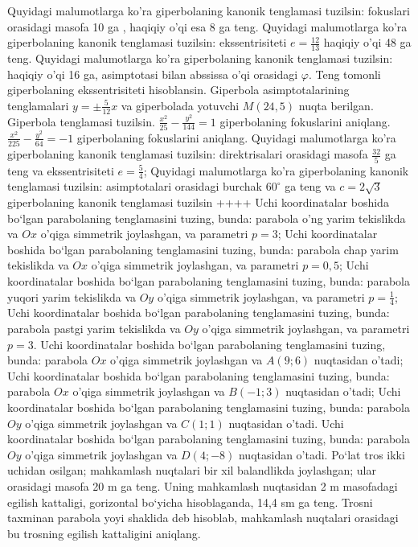 Quyidagi malumotlarga ko'ra giperbolaning kanonik tenglamasi tuzilsin: fokuslari orasidagi masofa 10 ga , haqiqiy o'qi esa 8 ga teng.
Quyidagi malumotlarga ko'ra giperbolaning kanonik tenglamasi tuzilsin: ekssentrisiteti $e=\frac{12}{13}$ haqiqiy o'qi 48 ga teng.
Quyidagi malumotlarga ko'ra giperbolaning kanonik tenglamasi tuzilsin: haqiqiy o'qi 16 ga, asimptotasi bilan abssissa o'qi orasidagi $\varphi$.
Teng tomonli giperbolaning ekssentrisiteti hisoblansin.
Giperbola asimptotalarining tenglamalari $y= \pm \frac{5}{12} x$ va giperbolada yotuvchi $M(24,5)$ nuqta berilgan. Giperbola tenglamasi tuzilsin.
$\frac{x^2}{25}-\frac{y^2}{144}=1$ giperbolaning fokuslarini aniqlang.
$\frac{x^2}{225}-\frac{y^2}{64}=-1$ giperbolaning fokuslarini aniqlang.
Quyidagi malumotlarga ko'ra giperbolaning kanonik tenglamasi tuzilsin: direktrisalari orasidagi masofa $\frac{32}{5}$ ga teng va ekssentrisiteti $e=\frac{5}{4}$;
Quyidagi malumotlarga ko'ra giperbolaning kanonik tenglamasi tuzilsin: asimptotalari orasidagi burchak $60^{\circ}$ ga teng va $c=2 \sqrt{3}$ giperbolaning kanonik tenglamasi tuzilsin
++++
Uchi koordinatalar boshida bo‘lgan parabolaning tenglamasini tuzing, bunda: parabola o'ng yarim tekislikda va $Ox$ o'qiga simmetrik joylashgan, va parametri $p=3$;
Uchi koordinatalar boshida bo‘lgan parabolaning tenglamasini tuzing, bunda: parabola chap yarim tekislikda va $Ox$ o'qiga simmetrik joylashgan, va parametri $p=0,5$;
Uchi koordinatalar boshida bo‘lgan parabolaning tenglamasini tuzing, bunda: parabola yuqori yarim tekislikda va $Oy$ o'qiga simmetrik joylashgan, va parametri $p=\frac{1}{4}$;
Uchi koordinatalar boshida bo‘lgan parabolaning tenglamasini tuzing, bunda: parabola pastgi yarim tekislikda va $Oy$ o'qiga simmetrik joylashgan, va parametri $p=3$.
Uchi koordinatalar boshida bo‘lgan parabolaning tenglamasini tuzing, bunda: parabola $Ox$ o'qiga simmetrik joylashgan va $A(9 ; 6)$ nuqtasidan o'tadi;
Uchi koordinatalar boshida bo‘lgan parabolaning tenglamasini tuzing, bunda: parabola $Ox$ o'qiga simmetrik joylashgan va $B(-1 ; 3)$ nuqtasidan o'tadi;
Uchi koordinatalar boshida bo‘lgan parabolaning tenglamasini tuzing, bunda: parabola $Oy$ o'qiga simmetrik joylashgan va $C(1 ; 1)$ nuqtasidan o’tadi.
Uchi koordinatalar boshida bo‘lgan parabolaning tenglamasini tuzing, bunda: parabola $Oy$ o'qiga simmetrik joylashgan va $D(4 ;-8)$ nuqtasidan o’tadi.
Po‘lat tros ikki uchidan osilgan; mahkamlash nuqtalari bir xil balandlikda joylashgan; ular orasidagi masofa 20 m ga teng. Uning mahkamlash nuqtasidan 2 m masofadagi egilish kattaligi, gorizontal bo‘yicha hisoblaganda, 14,4 sm ga teng. Trosni taxminan parabola yoyi shaklida deb hisoblab, mahkamlash nuqtalari orasidagi bu trosning egilish kattaligini aniqlang.
